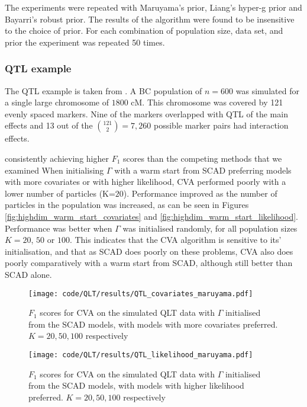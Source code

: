 \documentclass{amsart}[12pt]
\begin{document}
The experiments were repeated with Maruyama's prior, Liang's hyper-g prior and Bayarri's robust prior.
The results of the algorithm were found to be insensitive to the choice of prior.
For each combination of population size, data set, and prior the experiment was repeated 50 times.

\subsubsection{QTL example}
The QTL example is taken from \cite{Xu2007}. A BC population of $n=600$ was simulated for a single large
chromosome of $1800$ cM. This chromosome was covered by 121 evenly spaced markers. Nine of the markers
overlapped with QTL of the main effects and 13 out of the $\binom{121} 2 = 7,260$ possible marker pairs had
interaction effects.

consistently achieving higher $F_1$ scores than the competing methods that we examined
When initialising $\Gamma$ with a warm start from SCAD preferring models with more covariates or with higher
likelihood, CVA performed poorly with a lower number of particles (K=$20$). Performance improved as the number
of particles in the population was increased, as can be seen in Figures
\ref{fig:highdim_warm_start_covariates} and \ref{fig:highdim_warm_start_likelihood}. Performance was better
when $\Gamma$ was initialised randomly, for all population sizes $K=20$, $50$ or $100$. This indicates that
the CVA algorithm is sensitive to its' initialisation, and that as SCAD does poorly on these problems, CVA
also does poorly comparatively with a warm start from SCAD, although still better than SCAD alone.

\begin{figure}\label{fig:QLT_warm_start_covariates}
\caption{$F_1$ scores for CVA on the simulated QLT data with $\Gamma$ initialised from the SCAD models, with
models with more covariates preferred. $K=20, 50, 100$ respectively}
\texttt{[image: code/QLT/results/QTL\_covariates\_maruyama.pdf]}

\end{figure}

\begin{figure}\label{fig:QLT_warm_start_covariates}
\caption{$F_1$ scores for CVA on the simulated QLT data with $\Gamma$ initialised from the SCAD models, with
models with higher likelihood preferred. $K=20, 50, 100$ respectively}
\texttt{[image: code/QLT/results/QTL\_likelihood\_maruyama.pdf]}
\end{figure}
\end{document}

